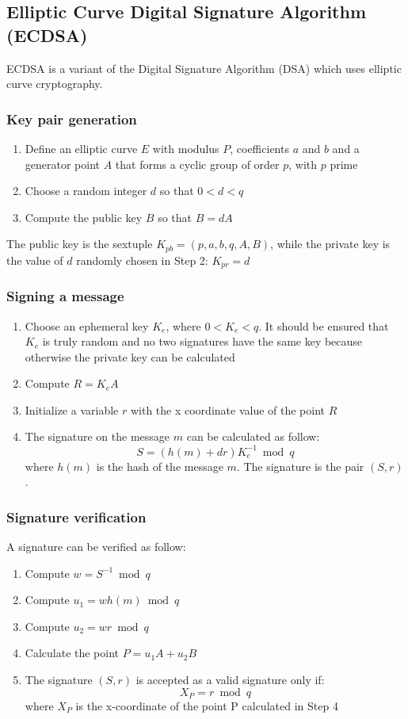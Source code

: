 \subsection{Elliptic Curve Digital Signature Algorithm (ECDSA)}
ECDSA is a variant of the Digital Signature Algorithm (DSA) which uses elliptic
curve cryptography.

\subsubsection{Key pair generation}
\begin{enumerate}
  \item Define an elliptic curve $E$ with modulus $P$, coefficients $a$ and $b$ and a
  generator point $A$ that forms a cyclic group of order $p$, with $p$ prime
  \item Choose a random integer $d$ so that ${0 < d < q}$
  \item Compute the public key $B$ so that ${B = d  A}$
\end{enumerate}
The public key is the sextuple ${K_{pb} = (p,a,b,q,A,B)}$, while the private key
is the value of $d$ randomly chosen in Step 2: ${K_{pr} = d}$

\subsubsection{Signing a message}
\begin{enumerate}
  \item Choose an ephemeral key $K_e$, where ${0 < K_e < q}$.
  It should be ensured that $K_e$ is truly random and no two signatures have the same key
  because otherwise the private key can be calculated
  \item Compute ${R = K_e A}$
  \item Initialize a variable $r$ with the x coordinate value of the point $R$
  \item The signature on the message $m$ can be calculated as follow:
  \[{S=(h(m)+d r)K_e^{-1}\bmod q}\]
  where $h(m)$ is the hash of the message $m$. The signature is the pair ${(S,r)}$.
\end{enumerate}

\subsubsection{Signature verification}
A signature can be verified as follow:
\begin{enumerate}
  \item Compute ${w=S^{-1}\bmod q}$
  \item Compute ${u_1=w  h(m)\bmod q}$
  \item Compute ${u_2=w  r \bmod q}$
  \item Calculate the point ${P=u_1  A + u_2  B}$
  \item The signature ${(S,r)}$ is accepted as a valid signature only if:
   \[{X_P=r \bmod q}\]
   where $X_P$ is the x-coordinate of the point P calculated in Step 4
\end{enumerate}








